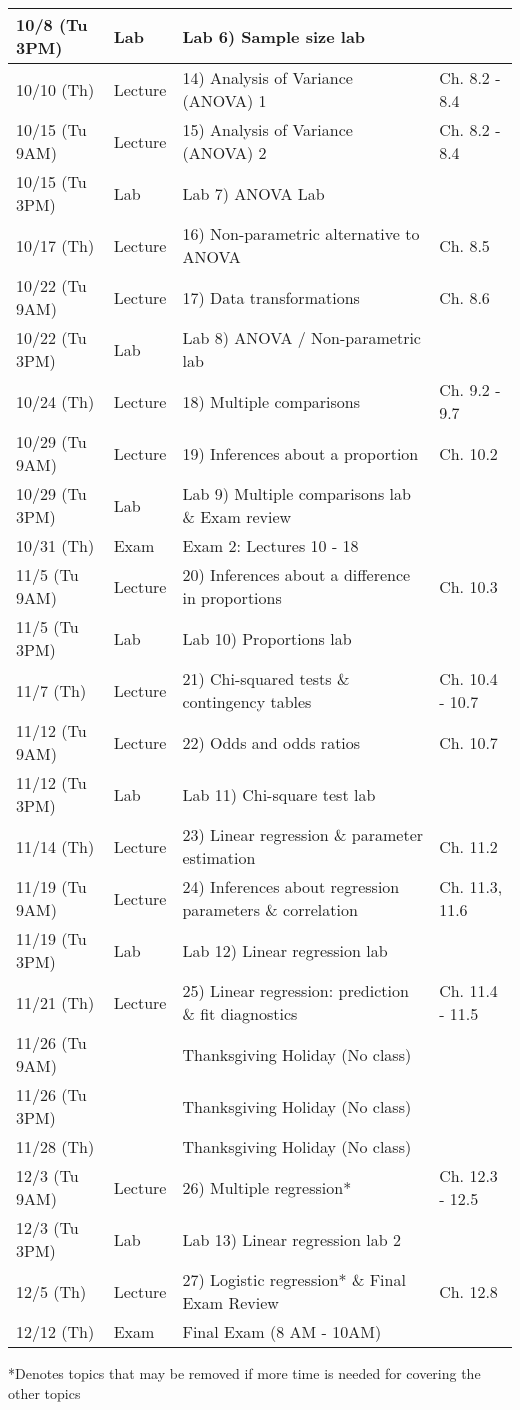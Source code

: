 \documentclass{article}
\begin{document}
\begin{center}
\begin{tabular}{|p{2.5cm}|p{1.5cm}|p{9cm}|p{2.8cm}|}
		10/8 (Tu 3PM) & Lab & Lab 6) Sample size lab & \\ \hline 
		10/10 (Th) & Lecture & 14) Analysis of Variance (ANOVA) 1 & Ch. 8.2 - 8.4 \\ \hline
		10/15 (Tu 9AM) & Lecture & 15) Analysis of Variance (ANOVA) 2 & Ch. 8.2 - 8.4 \\ \hline
		10/15 (Tu 3PM) & Lab & Lab 7) ANOVA Lab & \\ \hline
		10/17 (Th) & Lecture & 16) Non-parametric alternative to ANOVA & Ch. 8.5 \\ \hline
		10/22 (Tu 9AM) & Lecture & 17) Data transformations & Ch. 8.6 \\ \hline
		10/22 (Tu 3PM) & Lab & Lab 8) ANOVA / Non-parametric lab  & \\ \hline
		10/24 (Th) & Lecture & 18) Multiple comparisons & Ch. 9.2 - 9.7 \\ \hline
		10/29 (Tu 9AM) & Lecture & 19) Inferences about a proportion & Ch. 10.2 \\ \hline
		10/29 (Tu 3PM) & Lab & Lab 9) Multiple comparisons lab \& Exam review & \\ \hline
		10/31 (Th) & Exam & Exam 2: Lectures 10 - 18 & \\ \hline
		11/5 (Tu 9AM) & Lecture & 20) Inferences about a difference in proportions & Ch. 10.3 \\ \hline
		11/5 (Tu 3PM) & Lab & Lab 10) Proportions lab & \\ \hline
		11/7 (Th) & Lecture & 21) Chi-squared tests \& contingency tables & Ch. 10.4 - 10.7 \\ \hline
		11/12 (Tu 9AM) & Lecture & 22) Odds and odds ratios & Ch. 10.7 \\ \hline
		11/12 (Tu 3PM) & Lab & Lab 11) Chi-square test lab & \\ \hline
		11/14 (Th) & Lecture & 23) Linear regression \& parameter estimation & Ch. 11.2 \\ \hline
		11/19 (Tu 9AM) & Lecture & 24) Inferences about regression parameters \& correlation  & Ch. 11.3, 11.6 \\ \hline
		11/19 (Tu 3PM) & Lab & Lab 12) Linear regression lab & \\ \hline
		11/21 (Th) & Lecture & 25) Linear regression: prediction \& fit diagnostics & Ch. 11.4 - 11.5 \\ \hline
		11/26 (Tu 9AM) & & Thanksgiving Holiday (No class) & \\ \hline
		11/26 (Tu 3PM) & & Thanksgiving Holiday (No class) & \\ \hline
		11/28 (Th) & & Thanksgiving Holiday (No class) & \\ \hline
		12/3 (Tu 9AM) & Lecture & 26) Multiple regression* & Ch. 12.3 - 12.5\\ \hline
		12/3 (Tu 3PM) & Lab & Lab 13) Linear regression lab 2 & \\ \hline
		12/5 (Th) & Lecture & 27) Logistic regression* \& Final Exam Review  & Ch. 12.8 \\ \hline
		12/12 (Th) & Exam &  Final Exam (8 AM - 10AM) & \\ \hline
	\end{tabular}
\end{center}
*Denotes topics that may be removed if more time is needed for covering the other topics
\end{document}
